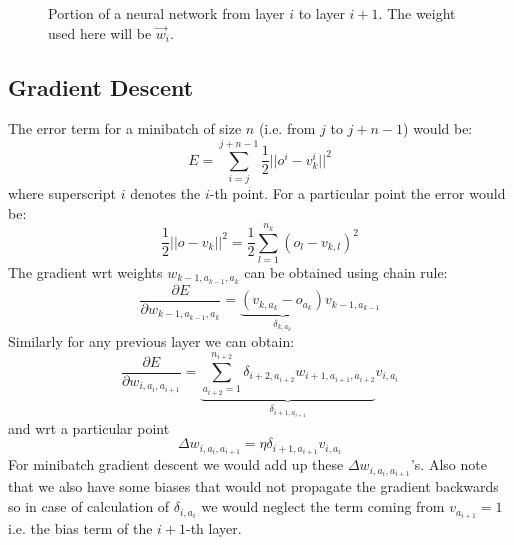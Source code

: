 \documentclass{article}
\begin{document}
\begin{figure}[H]
\centering
{}
\caption{Portion of a neural network from layer $i$ to layer $i+1$. The weight used here will be $\vec w_i$.}
\end{figure}
\subsection{Gradient Descent}
The error term for a minibatch of size $n$ (i.e. from $j$ to $j+n-1$) would be:
$$E = \sum_{i=j}^{j+n-1}\frac 12 || o^i- v_{k}^i||^2$$
where superscript $i$ denotes the $i$-th point.
For a particular point the error would be:
$$\frac 12 || o- v_{k}||^2=\frac 12\sum_{l=1}^{n_k}(o_{l}-v_{k,l})^2$$
The gradient wrt weights $w_{k-1,a_{k-1},a_{k}}$ can be obtained using chain rule:\\
$$\frac{\partial E}{\partial w_{k-1,a_{k-1},a_{k}}}=\underbrace{(v_{k,a_k}-o_{a_k})}_{\delta_{k,a_k}}v_{k-1,a_{k-1}}$$
Similarly for any previous layer we can obtain:\\
$$\frac{\partial E}{\partial w_{i,a_i,a_{i+1}}}=\underbrace{\sum_{a_{i+2}=1}^{n_{i+2}} \delta_{i+2,a_{i+2}}w_{i+1,a_{i+1},a_{i+2}}}_{\delta_{i+1,a_{i+1}}}v_{i,a_i}$$
and wrt a particular point\\
$$\Delta w_{i,a_i,a_{i+1}}=\eta \delta_{i+1,a_{i+1}}v_{i,a_i}$$
For minibatch gradient descent we would add up these $\Delta w_{i,a_i,a_{i+1}}$'s. Also note that we also have some biases that would not propagate the gradient backwards so in case of calculation of $\delta_{i,a_i}$ we would neglect the term coming from $v_{a_{i+1}}=1$ i.e. the bias term of the $i+1$-th layer.
\end{document}
